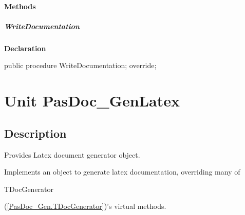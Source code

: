 \documentclass{report}
\newif\ifpdf
\begin{document}
\subsubsection*{\large{\textbf{Methods}}\normalsize\hspace{1ex}\hfill}
\paragraph*{WriteDocumentation}\hspace*{\fill}

\label{PasDoc_GenHtmlHelp.THTMLHelpDocGenerator-WriteDocumentation}
\begin{list}{}{
\setlength{\itemindent}{0cm}
\setlength{\listparindent}{0cm}
\setlength{\leftmargin}{\evensidemargin}
\addtolength{\leftmargin}{\tmplength}
\settowidth{\labelsep}{X}
\addtolength{\leftmargin}{\labelsep}
\setlength{\labelwidth}{\tmplength}
}
\item[\textbf{Declaration}\hfill]
\ifpdf
\begin{flushleft}
\fi
\begin{ttfamily}
public procedure WriteDocumentation; override;\end{ttfamily}

\ifpdf
\end{flushleft}
\fi

\end{list}
\chapter{Unit PasDoc{\_}GenLatex}
\label{PasDoc_GenLatex}
\section{Description}
Provides Latex document generator object.\hfill\vspace*{1ex}



Implements an object to generate latex documentation, overriding many of \begin{ttfamily}TDocGenerator\end{ttfamily}(\ref{PasDoc_Gen.TDocGenerator})'s virtual methods.
\end{document}
